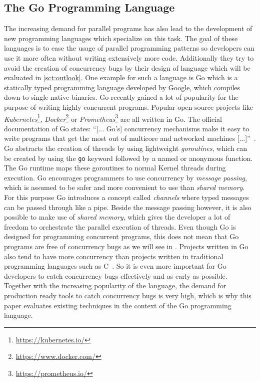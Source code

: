 \documentclass[conference]{IEEEtran}
\begin{document}
\subsection{The Go Programming Language}
The increasing demand for parallel programs has also lead to the development of new programming languages which specialize on this task.
The goal of these languages is to ease the usage of parallel programming patterns so developers can use it more often without writing extensively more code.
Additionally they try to avoid the creation of concurrency bugs by their design of language which will be evaluated in \cref{sct:outlook}.
One example for such a language is Go which is a statically typed programming language developed by Google, which compiles down to single native binaries.
Go recently gained a lot of popularity for the purpose of writing highly concurrent programs.
Popular open-source projects like \emph{Kubernetes}\footnote{\url{https://kubernetes.io/}}, \emph{Docker}\footnote{\url{https://www.docker.com/}} or \emph{Prometheus}\footnote{\url{https://prometheus.io/}} are all written in Go.
The official documentation of Go states: ``[... Go's] concurrency mechanisms make it easy to write programs that get the most out of multicore and networked machines [...]''~\cite{goDocs}.
Go abstracts the creation of threads by using lightweight \emph{goroutines}, which can be created by using the \lstinline{go} keyword followed by a named or anonymous function.
The Go runtime maps these goroutines to normal Kernel threads during execution.
Go encourages programmers to use concurrency by \emph{message passing}, which is assumed to be safer and more convenient to use than \emph{shared memory}.
For this purpose Go introduces a concept called \emph{channels} where typed messages can be passed through like a pipe.
Beside the message passing however, it is also possible to make use of \emph{shared memory}, which gives the developer a lot of freedom to orchestrate the parallel execution of threads.
Even though Go is designed for programming concurrent programs, this does not mean that Go programs are free of concurrency bugs as we will see in .
Projects written in Go also tend to have more concurrency than projects written in traditional programming languages such as C~\cite{tu2019go}.
So it is even more important for Go developers to catch concurrency bugs effectively and as early as possible.
Together with the increasing popularity of the language, the demand for production ready tools to catch concurrency bugs is very high, which is why this paper evaluates existing techniques in the context of the Go programming language.
\end{document}
